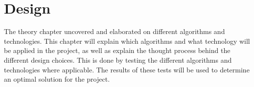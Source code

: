 \chapter{Design}
The theory chapter uncovered and elaborated on different algorithms and technologies.
This chapter will explain which algorithms and what technology will be applied in the project, as well as explain the thought process behind the different design choices.
This is done by testing the different algorithms and technologies where applicable.
The results of these tests will be used to determine an optimal solution for the project.











